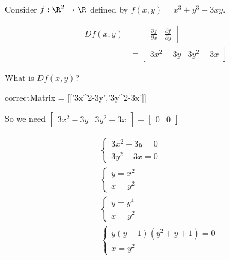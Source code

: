\documentclass{ximera}
\begin{document}
	\begin{question}
		Consider \(f: \R^2 \to \R\) defined by $f(x,y) = x^3+y^3-3xy$. 
		\begin{solution}
			\begin{hint}
				\begin{question}
					\begin{solution}
						\begin{hint}
							\begin{align*}
								Df(x,y) &= \begin{bmatrix} \frac{\partial f}{\partial x} & \frac{\partial f}{\partial y}\end{bmatrix}\\
									&= \begin{bmatrix} 3x^2-3y & 3y^2-3x\end{bmatrix}
							\end{align*}
						\end{hint}
						What is $Df(x,y)$?
							\begin{matrix-answer}
								correctMatrix = [['3x^2-3y','3y^2-3x']]
							\end{matrix-answer}
					\end{solution}
				\end{question}
			\end{hint}
			\begin{hint}
				So we need \(\begin{bmatrix} 3x^2-3y & 3y^2-3x\end{bmatrix} = \begin{bmatrix} 0 & 0\end{bmatrix}\)
			\end{hint}
			\begin{hint}
				\begin{align*}
					&\begin{cases}
						3x^2-3y=0\\
						3y^2-3x=0
					\end{cases}
					\\
					&\begin{cases}
						y=x^2\\
						x=y^2
					\end{cases}
					\\
					&\begin{cases}
						y=y^4\\
						x=y^2
					\end{cases}
					\\
					&\begin{cases}
						y(y-1)(y^2+y+1) = 0\\
						x=y^2
					\end{cases}
				\end{align*}
			\end{hint}
			

\end{solution}
\end{question}
\end{document}
